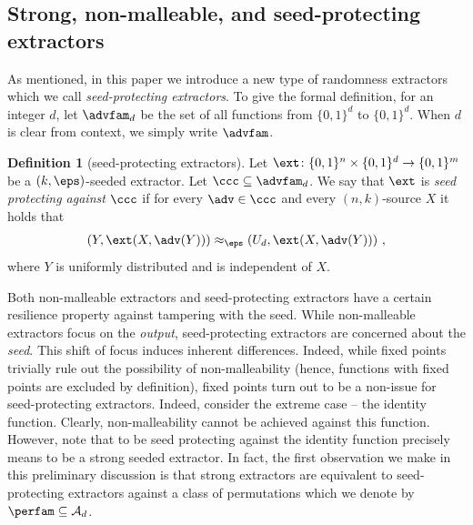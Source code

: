 \documentclass[11pt]{article}
\numberwithin{equation}{section}
\theoremstyle{definition}
\newtheorem{definition}[theorem]{Definition}
\theoremstyle{plain}
\begin{document}
\subsection{Strong, non-malleable, and seed-protecting extractors}\label{sec:snsp}
As mentioned, in this %
paper  %
we introduce a new type of randomness extractors which we call \emph{seed-protecting extractors}. To give the formal definition, for an integer $d$, let $\advfam_d$ be the set of all functions from $\{0,1\}^d$ to $\{0,1\}^d$. When $d$ is clear from context, we simply write $\advfam$.%

\begin{definition}[seed-protecting extractors]\label{def:sp intro}
	Let $\ext \colon \{0,1\}^n \times \{0,1\}^d \to \{0,1\}^m$ be a $(k,\eps)$-seeded extractor. Let $\ccc \subseteq \advfam_d$. We say that $\ext$ is \emph{seed protecting against $\ccc$} if for every $\adv \in \ccc$ and every $(n,k)$-source $X$ it holds that
	\begin{equation}\label{eq:intro 123}
	\left(Y, \ext(X,\adv(Y))\right) \approx_\eps \left(U_d, \ext(X,\adv(Y))\right)\,,
	\end{equation}
	where $Y$ is uniformly distributed and is independent of $X$.
\end{definition}



Both non-malleable extractors and seed-protecting extractors have a certain resilience property against tampering %
with  %
the seed. While non-malleable extractors focus on the \emph{output}, seed-protecting extractors are concerned about the \emph{seed}. This shift of focus induces inherent differences. Indeed, while fixed points trivially rule out the possibility of non-malleability (hence, functions with fixed points are excluded by definition), fixed points turn out to be a non-issue for seed-protecting extractors.  Indeed, consider the extreme case -- the identity function. Clearly, non-malleability cannot be achieved against this function. However, note that to be seed protecting against the identity function precisely means to be a strong seeded extractor. In fact, the first observation we make in this preliminary discussion is that strong extractors are equivalent to seed-protecting extractors against
%
a class of permutations %
which we denote by $\perfam \subseteq \mathcal{A}_d$. %
\end{document}
